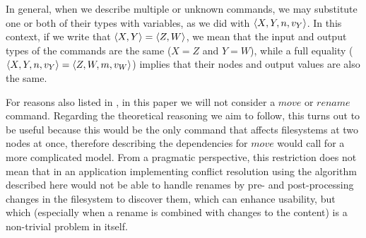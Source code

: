 In general, when we describe multiple or unknown commands, we may substitute one or both
of their types with variables, as we did with $\langle{X,Y,n,v_Y}\rangle$. In this context,
if we write that $\langle{X,Y}\rangle=\langle{Z,W}\rangle$, we mean that the input and output types
of the commands are the same ($X=Z$ and $Y=W$), while a full equality 
($\langle{X,Y,n,v_Y}\rangle=\langle{Z,W,m,v_W}\rangle$)
implies
that their nodes and output values are also the same.


\bigskip

\noindent
For reasons also listed in \cite{NREC}, in this paper we will not consider
a $move$ or $rename$ command. Regarding the theoretical reasoning we aim to follow,
this turns out to be useful because this would be the only command that affects
filesystems at two nodes at once, therefore describing 
the dependencies for $move$ would call for a more complicated model.
From a pragmatic perspective, this restriction does not mean that in an application
implementing conflict resolution using the algorithm described here would not be
able to handle renames by pre- and post-processing changes in the filesystem to
discover them, which can enhance usability, but which
(especially when a rename is combined with changes to the content)
is a non-trivial problem in itself.
